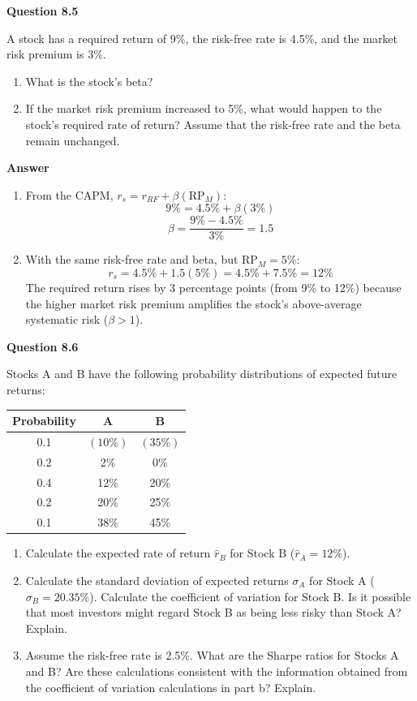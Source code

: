 \documentclass[11pt]{article}
\begin{document}
\textbf{Question 8.5}
\bigskip

A stock has a required return of 9\%, the risk-free rate is 4.5\%, and the market risk premium is 3\%.

\begin{enumerate}
  \item[a.] What is the stock's beta?
  \item[b.] If the market risk premium increased to 5\%, what would happen to the stock's required rate of return? Assume that the risk-free rate and the beta remain unchanged.
\end{enumerate}

\bigskip
\textbf{Answer}

\begin{enumerate}
  \item[a.] From the CAPM, $r_s = r_{RF} + \beta(\text{RP}_M)$:
    \[
      9\% = 4.5\% + \beta(3\%)
    \]
    \[
      \beta = \frac{9\%-4.5\%}{3\%} = \boxed{1.5}
    \]

  \item[b.] With the same risk-free rate and beta, but $\text{RP}_M = 5\%$:
    \[
      r_s = 4.5\% + 1.5(5\%) = 4.5\% + 7.5\% = \boxed{12\%}
    \]
    The required return rises by 3 percentage points (from 9\% to 12\%) because the higher market risk premium amplifies the stock's above-average systematic risk ($\beta>1$).
\end{enumerate}

\bigskip
\bigskip

\textbf{Question 8.6}
\bigskip

Stocks A and B have the following probability distributions of expected future returns:

\begin{center}
\begin{tabular}{ccc}
\hline
Probability & A & B \\
\hline
0.1 & $(10\%)$ & $(35\%)$ \\
0.2 & 2\%      & 0\%      \\
0.4 & 12\%     & 20\%     \\
0.2 & 20\%     & 25\%     \\
0.1 & 38\%     & 45\%     \\
\hline
\end{tabular}
\end{center}

\begin{enumerate}
  \item[a.] Calculate the expected rate of return $\hat{r}_B$ for Stock B ($\hat{r}_A=12\%$).
  \item[b.] Calculate the standard deviation of expected returns $\sigma_A$ for Stock A ($\sigma_B=20.35\%$). Calculate the coefficient of variation for Stock B. Is it possible that most investors might regard Stock B as being less risky than Stock A? Explain.
  \item[c.] Assume the risk-free rate is 2.5\%. What are the Sharpe ratios for Stocks A and B? Are these calculations consistent with the information obtained from the coefficient of variation calculations in part b? Explain.
\end{enumerate}
\end{document}
